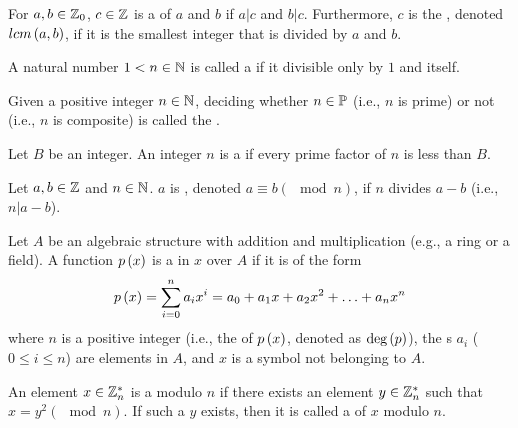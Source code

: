 \begin{defi}
For $a,b\in\mathbb{Z}_0$, $c\in\mathbb{Z}$ is a  of $a$ and $b$ if $a|c$ and $b|c$. Furthermore, $c$ is the , denoted $lcm\left(a,b\right)$, if it is the smallest integer that is divided by $a$ and $b$.
\cite{Oppliger:2011:CC:2049860}
\end{defi}

\begin{defi}
A natural number $1<n\in\mathbb{N}$ is called a  if it divisible only by $1$ and itself.
\cite{Oppliger:2011:CC:2049860}
\end{defi}

\begin{defi}
Given a positive integer $n\in\mathbb{N}$, deciding whether $n\in\mathbb{P}$ (i.e., $n$ is prime) or not (i.e., $n$ is composite) is called the .
\cite{Oppliger:2011:CC:2049860}
\end{defi}

\begin{defi}
Let $B$ be an integer. An integer $n$ is a  if every prime factor of $n$ is less than $B$.
\cite{Oppliger:2011:CC:2049860}
\end{defi}

\begin{defi}
Let $a,b\in\mathbb{Z}$ and $n\in\mathbb{N}$. $a$ is , denoted $a\equiv b \left(\mod n\right)$, if $n$ divides $a-b$ (i.e., $n|a-b$).
\cite{Oppliger:2011:CC:2049860}
\end{defi}

\begin{defi}[Polynomial]
Let $A$ be an algebraic structure with addition and multiplication (e.g., a ring or a field). A function $p\left(x\right)$ is a  in $x$ over $A$ if it is of the form
\begin{equation}
p\left(x\right)=\displaystyle\sum_{i=0}^{n}{a_ix^i}=a_0+a_1x+a_2x^2+\ldots+a_nx^n
\end{equation}
where $n$ is a positive integer (i.e., the  of $p\left(x\right)$, denoted as $\mbox{deg}\left(p\right)$), the s $a_i$ ($0\leq i\leq n$) are elements in $A$, and $x$ is a symbol not belonging to $A$.
\cite{Oppliger:2011:CC:2049860}
\end{defi}

\begin{defi}
An element $x\in\mathbb{Z}^*_n$ is a  modulo $n$ if there exists an element $y\in\mathbb{Z}^*_n$ such that $x=y^2\left(\mod n\right)$. If such a $y$ exists, then it is called a  of $x$ modulo $n$.
\cite{Oppliger:2011:CC:2049860}
\end{defi}

